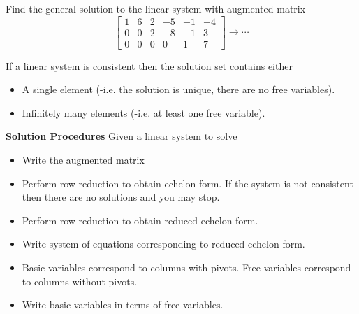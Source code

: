   \begin{frame}[fragile]
 Find the general solution to the linear system with augmented matrix
 \begin{equation*}
   \left[\begin{array}{rrrrrr}
   1 & 6 & 2 & -5 & -1 & -4 \\
   0 & 0 & 2 & -8 & -1 & 3 \\
   0 & 0 & 0 & 0  & 1  & 7
  \end{array}\right]
  \rightarrow \cdots
 \end{equation*}

\end{frame}


  \begin{frame}[fragile]
If a linear system is consistent then the solution set contains
either  
\begin{itemize}
\item A single element (-i.e. the solution is unique, there are no free variables).  
\item Infinitely many elements (-i.e. at least one free variable).
\end{itemize}
\end{frame}



  \begin{frame}[fragile]

\textbf{Solution Procedures} 
Given a linear system to solve
\begin{itemize}
 \item Write the augmented matrix   
 \item Perform row reduction to obtain echelon form.  If the system is not consistent then there are no solutions and you may stop. 
 \item Perform row reduction to obtain reduced echelon form.  
 \item Write system of equations corresponding to reduced echelon form.  
 \item Basic variables correspond to columns with pivots.  Free variables correspond to
 columns without pivots.  
 \item Write basic variables in terms of free variables.
\end{itemize}

\end{frame}


